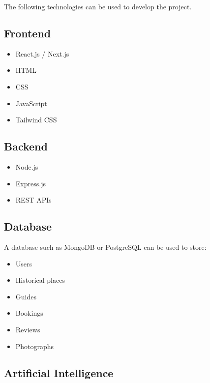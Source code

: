 \documentclass[12pt,a4paper]{article}
\begin{document}
The following technologies can be used to develop the project.

\subsection{Frontend}

\begin{itemize}[leftmargin=*]

    \item React.js / Next.js
    \item HTML
    \item CSS
    \item JavaScript
    \item Tailwind CSS

\end{itemize}


\subsection{Backend}

\begin{itemize}[leftmargin=*]

    \item Node.js
    \item Express.js
    \item REST APIs

\end{itemize}


\subsection{Database}

A database such as MongoDB or PostgreSQL can be used to store:

\begin{itemize}[leftmargin=*]

    \item Users
    \item Historical places
    \item Guides
    \item Bookings
    \item Reviews
    \item Photographs

\end{itemize}


\subsection{Artificial Intelligence}
\end{document}
